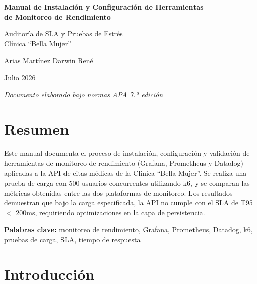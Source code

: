 \documentclass[12pt, a4paper]{article}
\begin{document}
\begin{titlepage}
\begin{center}

\vspace*{2cm}

{\Large\textbf{Manual de Instalación y Configuración de Herramientas\\de Monitoreo de Rendimiento}}

\vspace{1cm}

{\large Auditoría de SLA y Pruebas de Estrés\\Clínica ``Bella Mujer''}

\vspace{3cm}

{\large Arias Martínez Darwin René}

\vspace{1cm}

{\large Julio 2026}

\vfill

{\small\textit{Documento elaborado bajo normas APA 7.ª edición}}

\end{center}
\end{titlepage}

\section*{Resumen}

Este manual documenta el proceso de instalación, configuración y validación de herramientas de monitoreo de rendimiento (Grafana, Prometheus y Datadog) aplicadas a la API de citas médicas de la Clínica ``Bella Mujer''. Se realiza una prueba de carga con 500 usuarios concurrentes utilizando k6, y se comparan las métricas obtenidas entre las dos plataformas de monitoreo. Los resultados demuestran que bajo la carga especificada, la API no cumple con el SLA de T95 $<$ 200ms, requiriendo optimizaciones en la capa de persistencia.

\textbf{Palabras clave:} monitoreo de rendimiento, Grafana, Prometheus, Datadog, k6, pruebas de carga, SLA, tiempo de respuesta

\newpage

\section{Introducción}
\end{document}
